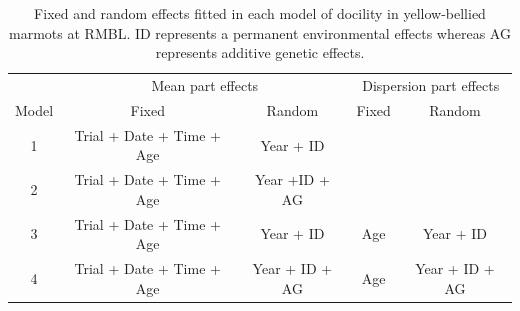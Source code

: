 \documentclass[a4paper,12pt,twoside]{article}
\begin{document}
	\begin{table}[!ht]
		\caption{Fixed and random effects fitted in each model of docility in yellow-bellied marmots at RMBL. 
			ID represents a permanent environmental effects whereas AG represents additive genetic effects.}
		\label{Tab:models}
		\centering
		\begin{tabular}{c c c c c}
			\hline
			\multicolumn{1}{c}{} &
			\multicolumn{2}{c}{Mean part effects} &
			\multicolumn{2}{c}{Dispersion part effects}\\ 
			Model & Fixed & Random & Fixed & Random \\
			\hline
			1 & Trial + Date + Time + Age & Year + ID & & \\
			2 & Trial + Date + Time + Age & Year +ID + AG & & \\
			3 & Trial + Date + Time + Age & Year + ID & Age & Year + ID \\
			4 & Trial + Date + Time + Age & Year + ID + AG & Age & Year + ID + AG\\
			\hline
		\end{tabular}
	\end{table}
	\newpage
	
\end{document}
